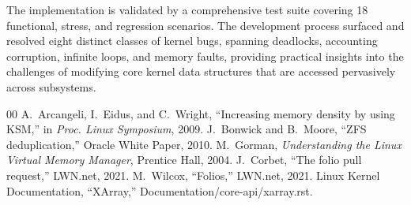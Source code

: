 \documentclass[conference]{IEEEtran}
\begin{document}
The implementation is validated by a comprehensive test suite covering 18 functional, stress, and regression scenarios. The development process surfaced and resolved eight distinct classes of kernel bugs, spanning deadlocks, accounting corruption, infinite loops, and memory faults, providing practical insights into the challenges of modifying core kernel data structures that are accessed pervasively across subsystems.

\begin{thebibliography}{00}
 A.~Arcangeli, I.~Eidus, and C.~Wright, ``Increasing memory density by using KSM,'' in \textit{Proc. Linux Symposium}, 2009.
 J.~Bonwick and B.~Moore, ``ZFS deduplication,'' Oracle White Paper, 2010.
 M.~Gorman, \textit{Understanding the Linux Virtual Memory Manager}, Prentice Hall, 2004.
 J.~Corbet, ``The folio pull request,'' LWN.net, 2021.
 M.~Wilcox, ``Folios,'' LWN.net, 2021.
 Linux Kernel Documentation, ``XArray,'' Documentation/core-api/xarray.rst.
\end{thebibliography}
\end{document}

